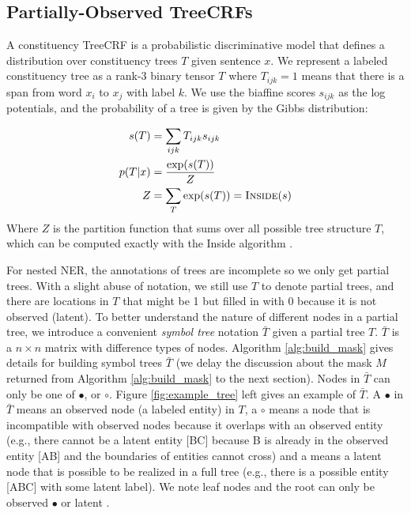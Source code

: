 \subsection{Partially-Observed TreeCRFs}
\label{ssec:po_treecrfs}

A constituency TreeCRF is a probabilistic discriminative model that defines a distribution over constituency trees $T$ given  sentence $x$. 
We represent a labeled constituency tree as a rank-3 binary tensor $T$ where $T_{ijk} = 1$ means that there is a span from word $x_i$ to $x_j$ with label $k$. 
We use the biaffine scores $s_{ijk}$ as the log potentials, and the probability of a tree is given by the Gibbs distribution: 

\begin{align}
  s(T) &= \sum_{ijk} T_{ijk}  s_{ijk} \\
  p(T | x) &= \frac{\exp(s(T))}{Z} \\
  Z &= \sum_T \exp(s(T)) = \textsc{Inside}(s) 
\end{align}
Where $Z$ is the partition function that sums over all possible tree structure $T$, which can be computed exactly with the Inside algorithm \citep{Eisner2016InsideOutsideAF}.  


For nested NER, the annotations of trees are incomplete so we only get partial trees. 
With a slight abuse of notation, we still use $T$ to denote partial trees,
and there are locations in $T$ that might be 1 but filled in with 0 because it is not observed (latent). 
To better understand the nature of different nodes in a partial tree, 
we introduce a convenient \textit{symbol tree}  notation $\bar{T}$ given a partial tree $T$. 
$\bar{T}$ is a $n \times n$ matrix with difference types of nodes.
Algorithm \ref{alg:build_mask} gives details for building symbol trees $\bar{T}$ (we delay the discussion about the mask $M$ returned from Algorithm \ref{alg:build_mask} to the next section).
Nodes in $\bar{T}$ can only be one of $\bullet$, \scalebox{0.8}{$\square$} or $\circ$. 
Figure \ref{fig:example_tree} left gives an example of $\bar{T}$. 
A $\bullet$ in $\bar{T}$ means an observed node (a labeled entity) in $T$, 
a $\circ$ means a node that is incompatible with observed nodes because it overlaps with an observed entity 
(e.g., there cannot be a latent entity [BC] because B is already in the observed entity [AB] and the boundaries of entities cannot cross)
and 
a \scalebox{0.8}{$\square$} means a latent node that is possible to be realized in a full tree (e.g., there is a possible entity [ABC] with some latent label). 
We note leaf nodes and the root can only be observed $\bullet$ or latent \scalebox{0.8}{$\square$}. 

